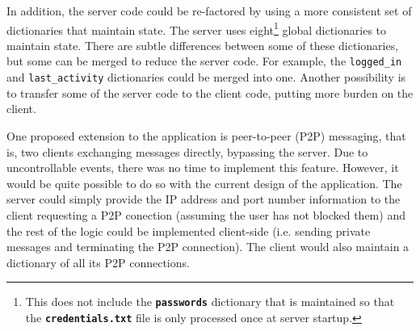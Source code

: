 \documentclass[12pt,a4paper]{article}
\begin{document}
In addition, the server code could be re-factored by using a more consistent set of dictionaries that maintain state. The server uses eight\footnote{This does not include the \textbf{\tt{passwords}} dictionary that is maintained so that the \textbf{\tt{credentials.txt}} file is only processed once at server startup.} global dictionaries to maintain state. There are subtle differences between some of these dictionaries, but some can be merged to reduce the server code. For example, the \verb|logged_in| and \verb|last_activity| dictionaries could be merged into one. Another possibility is to transfer some of the server code to the client code, putting more burden on the client.

One proposed extension to the application is peer-to-peer (P2P) messaging, that is, two clients exchanging messages directly, bypassing the server. Due to uncontrollable events, there was no time to implement this feature. However, it would be quite possible to do so with the current design of the application. The server could simply provide the IP address and port number information to the client requesting a P2P conection (assuming the user has not blocked them) and the rest of the logic could be implemented client-side (i.e. sending private messages and terminating the P2P connection). The client would also maintain a dictionary of all its P2P connections.
\end{document}
